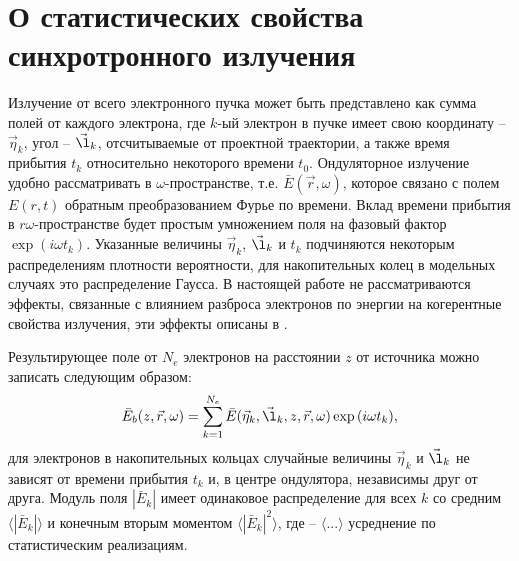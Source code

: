 \section{О статистических свойства синхротронного излучения}
Излучение от всего электронного пучка может быть представлено как сумма полей от каждого электрона, где $k$-ый электрон в пучке имеет свою координату -- $\vec{\eta}_k$, угол -- $\vec{\l}_k$, отсчитываемые от проектной траектории, а также время прибытия $t_k$ относительно некоторого времени $t_0$. Ондуляторное излучение удобно рассматривать в $\omega$-пространстве, т.е. $\bar{E}(\vec{r}, \omega)$, которое связано с полем $E(r, t)$ обратным преобразованием Фурье по времени. Вклад времени прибытия в $r\omega$-пространстве будет простым умножением поля на фазовый фактор $\exp{(i \omega t_k)}$. Указанные величины $\vec{\eta}_k$, $\vec{\l}_k$ и $t_k$ подчиняются некоторым распределениям плотности вероятности, для накопительных колец в модельных случаях это распределение Гаусса. В настоящей работе не рассматриваются эффекты, связанные с влиянием разброса электронов по энергии на когерентные свойства излучения, эти эффекты описаны в \cite{geloni_effects_2018}. 

Результирующее поле от $N_e$ электронов на расстоянии $z$ от источника можно записать следующим образом:
\begin{align}
	\bar{E}_{b} (z, \vec{r}, \omega) = \sum\limits_{k=1}^{N_e} \bar{E}(\vec{\eta}_k, \vec{\l}_k, z, \vec{r}, \omega) \exp{(i \omega t_k)},
	\label{eq:E_bunch} 
\end{align}
для электронов в накопительных кольцах случайные величины $\vec{\eta}_k$ и $\vec{\l}_k$ не зависят от времени прибытия $t_k$ и, в центре ондулятора, независимы друг от друга. Модуль поля $|\bar{E}_k|$ имеет одинаковое распределение для всех $k$ со средним $\big \langle|\bar{E}_k|\big \rangle$ и конечным вторым моментом  $\big \langle|\bar{E}_k|^2\big \rangle$, где -- $\langle . . . \rangle$ усреднение по статистическим реализациям.

